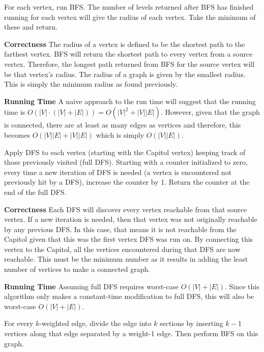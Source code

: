 \documentclass[12pt,twoside]{article}
\begin{document}
\begin{problems}
\begin{problemparts}
\end{problemparts}

\newpage
{} For each vertex, run BFS. The number of levels
    returned after BFS has finished running for each vertex will give the
    radius of each vertex. Take the minimum of these and return.

    {\bf Correctness} The radius of a vertex is defined to be the shortest
    path to the farthest vertex. BFS will return the shortest path to every
    vertex from a source vertex. Therefore, the longest path returned from
    BFS for the source vertex will be that vertex's radius. The radius of a
    graph is given by the smallest radius. This is simply the minimum radius
    as found previously.

    {\bf Running Time} A naive approach to the run time will suggest that the
    running time is $ O(|V| \cdot (|V| + |E|)) = O(|V|^2 + |V||E|)$. However,
    given that the graph is connected, there are at least as many edges as
    vertices and therefore, this becomes $O(|V||E| + |V||E|)$ which is simply
    $O(|V| |E|)$.

 Apply DFS to each vertex (starting with the
    Capitol vertex) keeping track of those previously visited (full DFS).
    Starting with a counter initialized to zero, every time a new iteration
    of DFS is needed (a vertex is encountered not previously hit by a DFS),
    increase the counter by 1. Return the counter at the end of the full DFS.

    {\bf Correctness} Each DFS will discover every vertex reachable from that
    source vertex. If a new iteration is needed, then that vertex was not
    originally reachable by any previous DFS. In this case, that means it is
    not reachable from the Capitol given that this was the first vertex DFS
    was run on. By connecting this vertex to the Capitol, all the vertices
    encountered during that DFS are now reachable. This must be the minimum
    number as it results in adding the least number of vertices to make a
    connected graph.

    {\bf Running Time} Assuming full DFS requires worst-case $O(|V| + |E|)$.
    Since this algorithm only makes a constant-time modification to full DFS,
    this will also be worst-case $O(|V| + |E|)$.

\newpage
\problem  %

\begin{problemparts}
 For every $k$-weighted edge, divide the edge
    into $k$ sections by inserting $k - 1$ vertices along that edge separated
    by a weight-1 edge. Then perform BFS on this graph.


\end{problemparts}
\end{problems}
\end{document}
